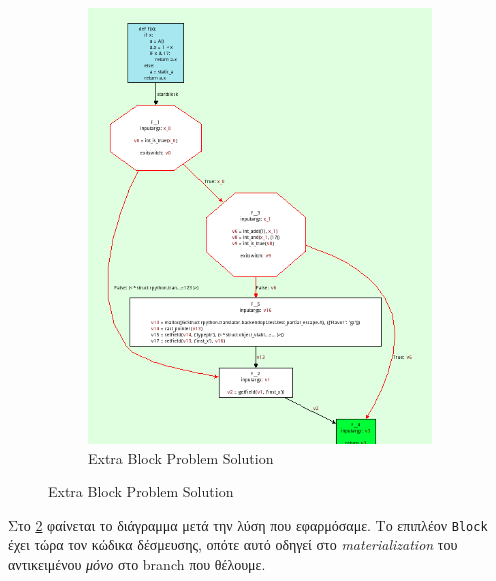 \begin{figure}[h]
\begin{subfigure}{0.4\textwidth}
\includegraphics[width=1.05\textwidth]{needs-extra-block-after.png}
\caption{Extra Block Problem Solution}
\label{figure-8:b}
\end{subfigure}
\end{figure}

Στο \ref{figure-8:b} φαίνεται το διάγραμμα μετά την λύση που εφαρμόσαμε. Το
επιπλέον \texttt{Block} έχει τώρα τον κώδικα δέσμευσης, οπότε αυτό οδηγεί στο
\textit{materialization} του αντικειμένου \textit{μόνο} στο branch που θέλουμε.

